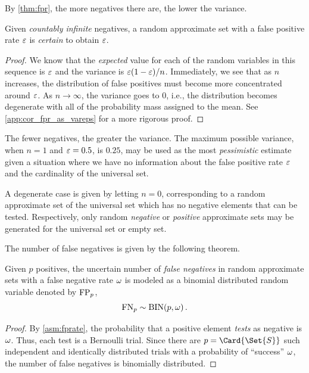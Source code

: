 \documentclass[10pt,final,hidelinks]{article}
\numberwithin{equation}{section}
\begin{document}
By \cref{thm:fpr}, the more negatives there are, the lower the variance.
\begin{corollary}
\label{cor:fpr_as_vareps}
	Given \emph{countably infinite} negatives, a random approximate set with a false positive rate $\varepsilon$ is \emph{certain} to obtain $\varepsilon$.
\end{corollary}
\begin{proof}
We know that the \emph{expected} value for each of the random variables in this sequence is $\varepsilon$ and the variance is $\varepsilon(1-\varepsilon)/n$.
Immediately, we see that as $n$ increases, the distribution of false positives must become more concentrated around $\varepsilon$.
As $n \to \infty$, the variance goes to $0$, i.e., the distribution becomes degenerate with all of the probability mass assigned to the mean. See \cref{app:cor_fpr_as_vareps} for a more rigorous proof.
\end{proof}

The fewer negatives, the greater the variance.
The maximum possible variance, when $n=1$ and $\varepsilon = 0.5$, is $0.25$, may be used as the most \emph{pessimistic} estimate given a situation where we have no information about the false positive rate $\varepsilon$ and the cardinality of the universal set.

A degenerate case is given by letting $n = 0$, corresponding to a random approximate set of the universal set which has no negative elements that can be tested.
Respectively, only random \emph{negative} or \emph{positive} approximate sets may be generated for the universal set or empty set.

The number of false negatives is given by the following theorem.
\begin{theorem}
\label{thm:fnbinom}
Given $p$ positives, the uncertain number of \emph{false negatives} in random approximate sets with a false negative rate $\omega$ is modeled as a binomial distributed random variable denoted by $\mathrm{FP}_p$,
\begin{equation}
	\mathrm{FN}_p \sim \mathrm{BIN}(p, \omega)\,.
\end{equation}
\end{theorem}
\begin{proof}
By \cref{asm:fprate}, the probability that a positive element \emph{tests} as negative is $\omega$.
Thus, each test is a Bernoulli trial.
Since there are $p = \Card{\Set{S}}$ such independent and identically distributed trials with a probability of ``success'' $\omega$, the number of false negatives is binomially distributed.
\end{proof}
\end{document}
